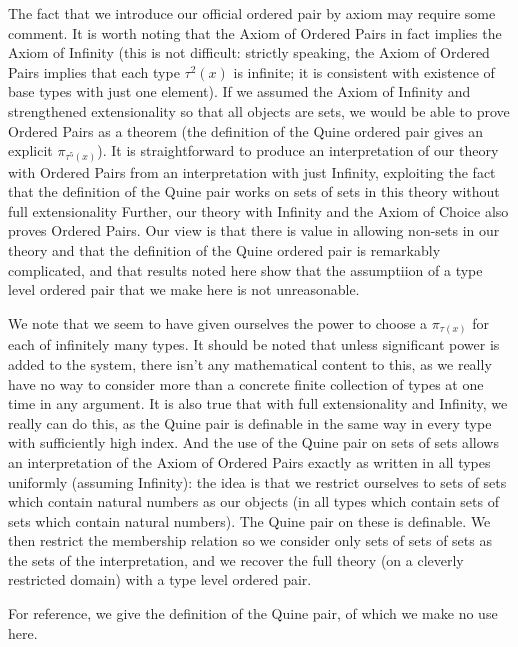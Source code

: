 \documentclass[12pt]{article}
\begin{document}
The fact that we introduce our official ordered pair by axiom may require some comment.  It is worth noting that the Axiom of Ordered Pairs in fact implies the
Axiom of Infinity (this is not difficult: strictly speaking, the Axiom of Ordered Pairs implies that each type $\tau^2(x)$ is infinite;  it is consistent with existence of base types with just one element).  If we assumed the Axiom of Infinity and strengthened extensionality so that all objects are sets, we would be able
to prove Ordered Pairs as a theorem (the definition of the Quine ordered pair gives an explicit $\pi_{\tau^5(x)}$).  It is straightforward to  produce an interpretation of our
theory with Ordered Pairs from an interpretation with just Infinity, exploiting the fact that the definition of the Quine pair works on sets of sets in this theory without full extensionality  Further, our theory with Infinity and the Axiom of Choice also proves Ordered Pairs.  Our view
is that there is value in allowing non-sets in our theory and that the definition of the Quine ordered pair is remarkably complicated, and that results noted here show that
the assumptiion of a type level ordered pair that we make here is not unreasonable.

We note that we seem to have given ourselves the power to choose a $\pi_{\tau(x)}$ for each of infinitely many types.  It should be noted that unless significant power is added to the system, there isn't any mathematical content to this, as we really have no way to consider more than a concrete finite collection of types at one time in any argument.  It is also true that with full extensionality and Infinity, we really can do this, as the Quine pair is definable in the same way in every type with sufficiently high index.  And the use of the Quine pair on sets of sets
allows an interpretation of the Axiom of Ordered Pairs exactly as written in all types uniformly (assuming Infinity):  the idea is that we restrict ourselves to sets of sets which contain natural numbers as our objects (in all types which contain sets of sets which contain natural numbers).  The Quine pair on these is definable.  We then restrict the membership relation so we consider only sets of sets of sets as the sets of the interpretation, and we recover the full theory (on a cleverly restricted domain) with a type level ordered pair.

For reference, we give the definition of the Quine pair, of which we make no use here.
\end{document}
